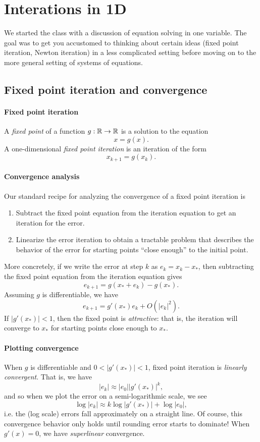 \documentclass[12pt, leqno]{article}
\begin{document}
\section{Interations in 1D}

We started the class with a discussion of equation solving
in one variable.  The goal was to get you accustomed to thinking
about certain ideas (fixed point iteration, Newton iteration)
in a less complicated setting before moving on to the more general
setting of systems of equations.

\subsection{Fixed point iteration and convergence}

\paragraph{Fixed point iteration}
A {\em fixed point} of a function $g : \mathbb{R} \rightarrow \mathbb{R}$ is a
solution to the equation
\[
  x = g(x).
\]
A one-dimensional {\em fixed point iteration} is an iteration of the
form
\[
  x_{k+1} = g(x_k).
\]

\paragraph{Convergence analysis}
Our standard recipe for analyzing the convergence of a fixed point
iteration is
\begin{enumerate}
\item Subtract the fixed point equation from the iteration equation
  to get an iteration for the error.
\item Linearize the error iteration to obtain a tractable problem
  that describes the behavior of the error for starting points
  ``close enough'' to the initial point.
\end{enumerate}
More concretely, if we write the error at step $k$ as $e_k = x_k-x_*$,
then subtracting the fixed point equation from the iteration equation
gives
\[
  e_{k+1} = g(x_* + e_k) - g(x_*).
\]
Assuming $g$ is differentiable, we have
\[
  e_{k+1} = g'(x_*) e_k + O(|e_k|^2).
\]
If $|g'(x_*)| < 1$, then the fixed point is {\em attractive}: 
that is, the iteration will converge to $x_*$ for starting points
close enough to $x_*$.

\paragraph{Plotting convergence}
When $g$ is differentiable and $0 < |g'(x_*)| < 1$, fixed point
iteration is {\em linearly convergent}.  That is, we have
\[
  |e_k| \approx |e_0| |g'(x_*)|^k,
\]
and so when we plot the error on a semi-logarithmic scale, we see
\[
  \log |e_k| \approx k \log |g'(x_*)| + \log |e_0|,
\]
i.e. the (log scale) errors fall approximately on a straight line.
Of course, this convergence behavior only holds until rounding error
starts to dominate!  When $g'(x) = 0$, we have {\em superlinear}
convergence.
\end{document}
